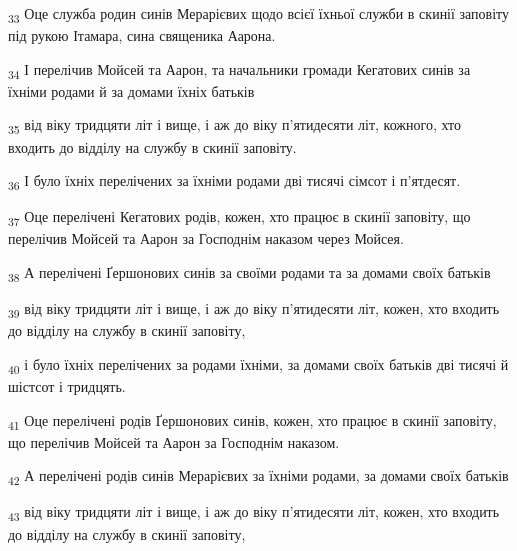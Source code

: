 \begin{tcolorbox}
\textsubscript{33} Оце служба родин синів Мерарієвих щодо всієї їхньої служби в скинії заповіту під рукою Ітамара, сина священика Аарона.
\end{tcolorbox}
\begin{tcolorbox}
\textsubscript{34} І перелічив Мойсей та Аарон, та начальники громади Кегатових синів за їхніми родами й за домами їхніх батьків
\end{tcolorbox}
\begin{tcolorbox}
\textsubscript{35} від віку тридцяти літ і вище, і аж до віку п'ятидесяти літ, кожного, хто входить до відділу на службу в скинії заповіту.
\end{tcolorbox}
\begin{tcolorbox}
\textsubscript{36} І було їхніх перелічених за їхніми родами дві тисячі сімсот і п'ятдесят.
\end{tcolorbox}
\begin{tcolorbox}
\textsubscript{37} Оце перелічені Кегатових родів, кожен, хто працює в скинії заповіту, що перелічив Мойсей та Аарон за Господнім наказом через Мойсея.
\end{tcolorbox}
\begin{tcolorbox}
\textsubscript{38} А перелічені Ґершонових синів за своїми родами та за домами своїх батьків
\end{tcolorbox}
\begin{tcolorbox}
\textsubscript{39} від віку тридцяти літ і вище, і аж до віку п'ятидесяти літ, кожен, хто входить до відділу на службу в скинії заповіту,
\end{tcolorbox}
\begin{tcolorbox}
\textsubscript{40} і було їхніх перелічених за родами їхніми, за домами своїх батьків дві тисячі й шістсот і тридцять.
\end{tcolorbox}
\begin{tcolorbox}
\textsubscript{41} Оце перелічені родів Ґершонових синів, кожен, хто працює в скинії заповіту, що перелічив Мойсей та Аарон за Господнім наказом.
\end{tcolorbox}
\begin{tcolorbox}
\textsubscript{42} А перелічені родів синів Мерарієвих за їхніми родами, за домами своїх батьків
\end{tcolorbox}
\begin{tcolorbox}
\textsubscript{43} від віку тридцяти літ і вище, і аж до віку п'ятидесяти літ, кожен, хто входить до відділу на службу в скинії заповіту,
\end{tcolorbox}
